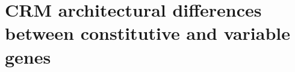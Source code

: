 \documentclass[../main.tex]{subfiles}
\begin{document}
	
\chapter{CRM architectural differences between constitutive and variable genes}
\label{chapter1}



\end{document}
